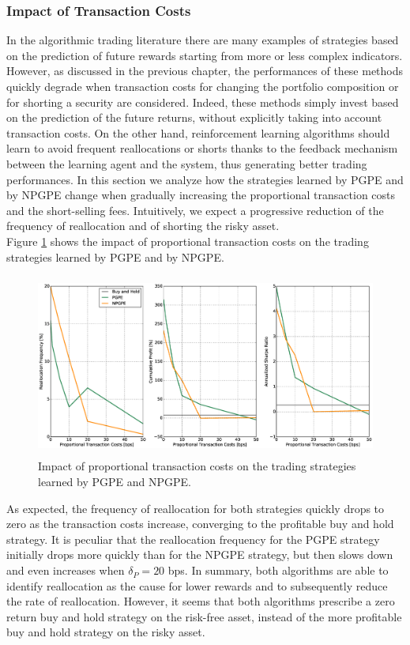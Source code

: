 \subsubsection{Impact of Transaction Costs}
In the algorithmic trading literature there are many examples of strategies based on the prediction of future rewards starting from more or less complex indicators. However, as discussed in the previous chapter, the performances of these methods quickly degrade when transaction costs for changing the portfolio composition or for shorting a security are considered. Indeed, these methods simply invest based on the prediction of the future returns, without explicitly taking into account transaction costs. On the other hand, reinforcement learning algorithms should learn to avoid frequent reallocations or shorts thanks to the feedback mechanism between the learning agent and the system, thus generating better trading performances. In this section we analyze how the strategies learned by \gls{PGPE} and by \gls{NPGPE} change when gradually increasing the proportional transaction costs and the short-selling fees. Intuitively, we expect a progressive reduction of the frequency of reallocation and of shorting the risky asset.\\
Figure \ref{fig:impact_transaction_costs} shows the impact of proportional transaction costs on the trading strategies learned by \gls{PGPE} and by \gls{NPGPE}. 
\begin{figure}[t!]
	\centering
	\includegraphics[height=6cm,width=1.0\textwidth]{Images/6_2_impact_transaction_costs}
	\caption[Proportional transaction costs and risk-neutral strategies]{Impact of proportional transaction costs on the trading strategies learned by PGPE and NPGPE.}
	\label{fig:impact_transaction_costs}
\end{figure}
As expected, the frequency of reallocation for both strategies quickly drops to zero as the transaction costs increase, converging to the profitable buy and hold strategy. It is peculiar that the reallocation frequency for the \gls{PGPE} strategy initially drops more quickly than for the \gls{NPGPE} strategy, but then slows down and even increases when $\delta_P = 20$ bps. In summary, both algorithms are able to identify reallocation as the cause for lower rewards and to subsequently reduce the rate of reallocation. However, it seems that both algorithms prescribe a zero return buy and hold strategy on the risk-free asset, instead of the more profitable buy and hold strategy on the risky asset.\\
